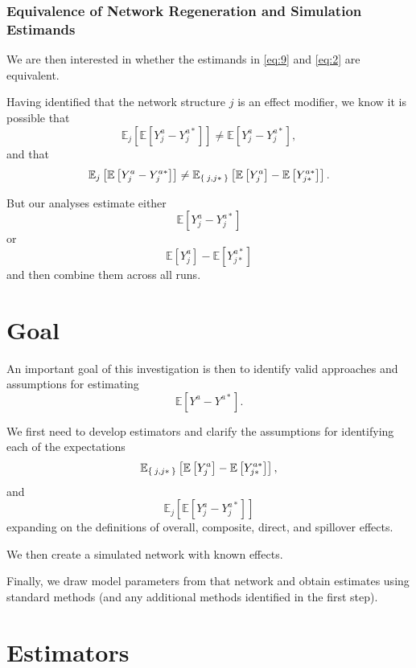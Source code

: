 \documentclass{article}
\theoremstyle{definition}
\begin{document}
\subsubsection{Equivalence of Network Regeneration and Simulation Estimands}
We are then interested in whether the estimands in \ref{eq:9} and \ref{eq:2} are equivalent.

Having identified that the network structure $j$ is an effect modifier, we know it is possible that \begin{equation}
    \mathbb{E}_{j}\left[\mathbb{E}\left[Y_{j}^{a}-Y_{j}^{a*}\right]\right] \neq \mathbb{E}\left[Y_{j}^{a}-Y_{j}^{a*}\right],
\end{equation}
and that
\begin{equation}
    \mathbb{E}_{j}\left[\mathbb{E}\left[Y_{j}^{a}-Y_{j}^{a*}\right]\right]\neq  \mathbb{E}_{\Set{j,j*}}\left[\mathbb{E}\left[Y_{j}^{a}\right]-\mathbb{E}\left[Y_{j*}^{a*}\right]\right]. 
\end{equation}

But our analyses estimate either 
\begin{equation*}
\mathbb{E}\left[Y_{j}^{a}-Y_{j}^{a*}\right]    
\end{equation*}
or 
\begin{equation*}
    \mathbb{E}\left[Y_{j}^{a}\right]-\mathbb{E}\left[Y_{j*}^{a*}\right]
\end{equation*}
and then combine them across all runs.
\section{Goal}
An important goal of this investigation is then to identify valid approaches and assumptions for estimating $$\mathbb{E}\left[Y^{a}-Y^{a*}\right].$$

We first need to develop estimators and clarify the assumptions for identifying each of the expectations $$\mathbb{E}_{\Set{j,j*}}\left[\mathbb{E}\left[Y_{j}^{a}\right]-\mathbb{E}\left[Y_{j*}^{a*}\right]\right],$$ and
$$\mathbb{E}_{j}\left[\mathbb{E}\left[Y_{j}^{a}-Y_{j}^{a*}\right]\right]$$ expanding on the definitions of overall, composite, direct, and spillover effects.

We then create a simulated network with known effects.

Finally, we draw model parameters from that network and obtain estimates using standard methods (and any additional methods identified in the first step).
\section{Estimators}
\end{document}
